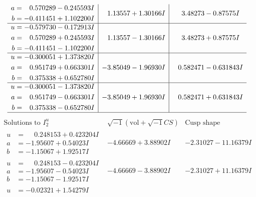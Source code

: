 \documentclass[1p]{elsarticle_modified}
\theoremstyle{definition}
\newcommand{\I}{\sqrt{-1}}
\begin{document}
$$\begin{array}{c|c|c}
\begin{aligned}
a &= \phantom{-}0.570289 - 0.245593 I \\
b &= -0.411451 + 1.102200 I\end{aligned}
 & \phantom{-}1.13557 + 1.30166 I & \phantom{-}3.48273 - 0.87575 I \\ \hline\begin{aligned}
u &= -0.579730 - 0.172913 I \\
a &= \phantom{-}0.570289 + 0.245593 I \\
b &= -0.411451 - 1.102200 I\end{aligned}
 & \phantom{-}1.13557 - 1.30166 I & \phantom{-}3.48273 + 0.87575 I \\ \hline\begin{aligned}
u &= -0.300051 + 1.373820 I \\
a &= \phantom{-}0.951749 + 0.663301 I \\
b &= \phantom{-}0.375338 + 0.652780 I\end{aligned}
 & -3.85049 - 1.96930 I & \phantom{-}0.582471 - 0.631843 I \\ \hline\begin{aligned}
u &= -0.300051 - 1.373820 I \\
a &= \phantom{-}0.951749 - 0.663301 I \\
b &= \phantom{-}0.375338 - 0.652780 I\end{aligned}
 & -3.85049 + 1.96930 I & \phantom{-}0.582471 + 0.631843 I\\
 \hline 
 \end{array}$$\newpage$$\begin{array}{c|c|c}  
\text{Solutions to }I^u_{2}& \I (\text{vol} + \sqrt{-1}CS) & \text{Cusp shape}\\
 \hline 
\begin{aligned}
u &= \phantom{-}0.248153 + 0.423204 I \\
a &= -1.95607 + 0.54023 I \\
b &= -1.15067 + 1.92517 I\end{aligned}
 & -4.66669 + 3.88902 I & -2.31027 - 11.16379 I \\ \hline\begin{aligned}
u &= \phantom{-}0.248153 - 0.423204 I \\
a &= -1.95607 - 0.54023 I \\
b &= -1.15067 - 1.92517 I\end{aligned}
 & -4.66669 - 3.88902 I & -2.31027 + 11.16379 I \\ \hline\begin{aligned}
u &= -0.02321 + 1.54279 I \\

\end{aligned}
\end{array}$$
\end{document}
